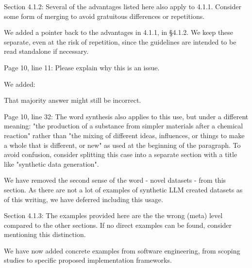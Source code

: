 \documentclass[12pt,english]{reviewresponse}
\begin{document}
\begin{revcomment}
Section 4.1.2: Several of the advantages listed here also apply to 4.1.1. Consider some form of merging to avoid gratuitous differences or repetitions.
\end{revcomment}
\begin{revresponse}
    We added a pointer back to the advantages in 4.1.1, in \S 4.1.2. We keep these separate, even at the risk of repetition, since the guidelines are intended to be read standalone if necessary.
\end{revresponse}

\begin{revcomment}
Page 10, line 11: Please explain why this is an issue.
\end{revcomment}
\begin{revresponse}
    We added:
    \begin{changes}
    That majority answer might still be incorrect.
    \end{changes}
\end{revresponse}

\begin{revcomment}
Page 10, line 32: The word synthesis also applies to this use, but under a different meaning: "the production of a substance from simpler materials after a chemical reaction" rather than "the mixing of different ideas, influences, or things to make a whole that is different, or new" as used at the beginning of the paragraph. To avoid confusion, consider splitting this case into a separate section with a title like "synthetic data generation".
\end{revcomment}
\begin{revresponse}
    We have removed the second sense of the word - novel datasets - from this section. As there are not a lot of examples of synthetic LLM created datasets as of this writing, we have deferred including this usage.
\end{revresponse}

\begin{revcomment}
Section 4.1.3: The examples provided here are the the wrong (meta) level compared to the other sections. If no direct examples can be found, consider mentioning this distinction.
\end{revcomment}
\begin{revresponse}
We have now added concrete examples from software engineering, from scoping studies to specific proposed implementation frameworks.

\end{revresponse}
\end{document}
